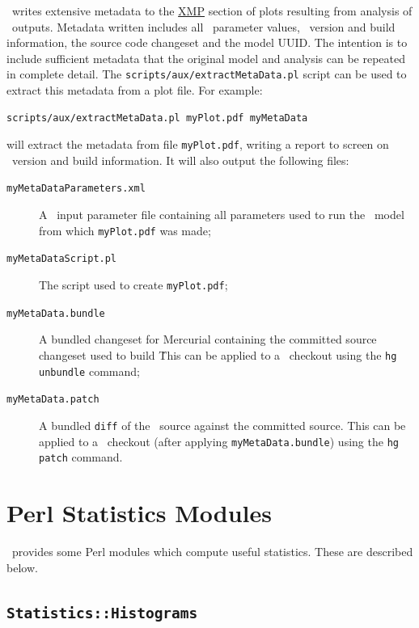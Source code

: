\glc\ writes extensive metadata to the \href{http://en.wikipedia.org/wiki/Extensible_Metadata_Platform}{XMP} section of plots resulting from analysis of \glc\ outputs. Metadata written includes all \glc\ parameter values, \glc\ version and build information, the source code changeset and the model \gls{UUID}. The intention is to include sufficient metadata that the original model and analysis can be repeated in complete detail. The {\tt scripts/aux/extractMetaData.pl} script can be used to extract this metadata from a plot file. For example:
\begin{verbatim}
scripts/aux/extractMetaData.pl myPlot.pdf myMetaData
\end{verbatim}
will extract the metadata from file {\tt myPlot.pdf}, writing a report to screen on \glc\ version and build information. It will also output the following files:
\begin{description}
\item[{\tt myMetaDataParameters.xml}] A \glc\ input parameter file containing all parameters used to run the \glc\ model from which {\tt myPlot.pdf} was made;
\item[{\tt myMetaDataScript.pl}] The script used to create {\tt myPlot.pdf};
\item[{\tt myMetaData.bundle}] A bundled changeset for Mercurial containing the committed source changeset used to build \glc\. This can be applied to a \glc\ checkout using the {\tt hg unbundle} command;
\item[{\tt myMetaData.patch}] A bundled {\tt diff} of the \glc\ source against the committed source. This can be applied to a \glc\ checkout (after applying {\tt myMetaData.bundle}) using the {\tt hg patch} command.
\end{description}

\section{Perl Statistics Modules}

\glc\ provides some Perl modules which compute useful statistics. These are described below.

\subsection{{\tt Statistics::Histograms}}

